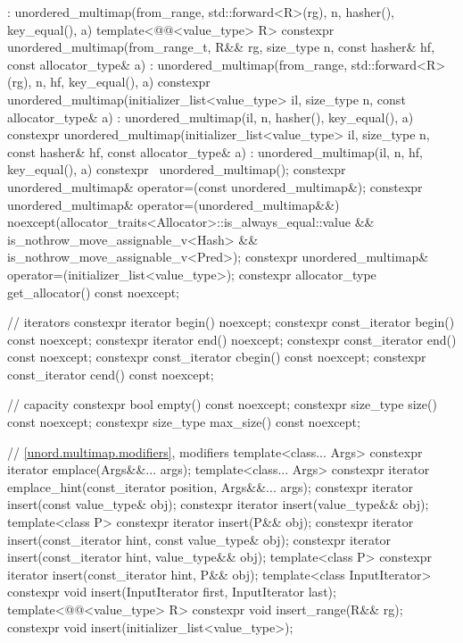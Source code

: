 \begin{codeblock}
{{      : unordered_multimap(from_range, std::forward<R>(rg),
                           n, hasher(), key_equal(), a) { }
  template<@@<value_type> R>
    constexpr unordered_multimap(from_range_t, R&& rg, size_type n, const hasher& hf,
                       const allocator_type& a)
      : unordered_multimap(from_range, std::forward<R>(rg), n, hf, key_equal(), a) { }
    constexpr unordered_multimap(initializer_list<value_type> il, size_type n,
                                 const allocator_type& a)
      : unordered_multimap(il, n, hasher(), key_equal(), a) { }
    constexpr unordered_multimap(initializer_list<value_type> il, size_type n, const hasher& hf,
                       const allocator_type& a)
      : unordered_multimap(il, n, hf, key_equal(), a) { }
    constexpr ~unordered_multimap();
    constexpr unordered_multimap& operator=(const unordered_multimap&);
    constexpr unordered_multimap& operator=(unordered_multimap&&)
      noexcept(allocator_traits<Allocator>::is_always_equal::value &&
               is_nothrow_move_assignable_v<Hash> && is_nothrow_move_assignable_v<Pred>);
    constexpr unordered_multimap& operator=(initializer_list<value_type>);
    constexpr allocator_type get_allocator() const noexcept;

    // iterators
    constexpr iterator       begin() noexcept;
    constexpr const_iterator begin() const noexcept;
    constexpr iterator       end() noexcept;
    constexpr const_iterator end() const noexcept;
    constexpr const_iterator cbegin() const noexcept;
    constexpr const_iterator cend() const noexcept;

    // capacity
    constexpr bool empty() const noexcept;
    constexpr size_type size() const noexcept;
    constexpr size_type max_size() const noexcept;

    // \ref{unord.multimap.modifiers}, modifiers
    template<class... Args> constexpr iterator emplace(Args&&... args);
    template<class... Args>
      constexpr iterator emplace_hint(const_iterator position, Args&&... args);
    constexpr iterator insert(const value_type& obj);
    constexpr iterator insert(value_type&& obj);
    template<class P> constexpr iterator insert(P&& obj);
    constexpr iterator insert(const_iterator hint, const value_type& obj);
    constexpr iterator insert(const_iterator hint, value_type&& obj);
    template<class P> constexpr iterator insert(const_iterator hint, P&& obj);
    template<class InputIterator> constexpr void insert(InputIterator first, InputIterator last);
    template<@@<value_type> R>
      constexpr void insert_range(R&& rg);
    constexpr void insert(initializer_list<value_type>);

}}
\end{codeblock}

